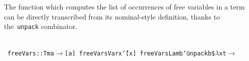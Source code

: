\documentclass[9pt,authoryear]{sigplanconf}
\begin{document}
%
The function which computes the list of occurrences of free variables in a term can
    be directly transcribed from its nominal-style definition, thanks
    to the{~}\texttt{unpack} combinator.%


{\nopagebreak }

%
%
%
~\\~\vphantom{$\{$}\texttt{freeVars\makebox[1.22ex][c]{\_{}}}\texttt{\mbox{\hspace{0.50em}}}\texttt{{:}{:}}\texttt{\mbox{\hspace{0.50em}}}\texttt{Tm}\texttt{\mbox{\hspace{0.50em}}}\texttt{a}\texttt{\mbox{\hspace{0.50em}}}\texttt{$ \rightarrow $}\texttt{\mbox{\hspace{0.50em}}}\texttt{{[}}\texttt{a}\texttt{{]}}\texttt{{\nopagebreak \newline%
}\vphantom{$\{$}}\texttt{freeVars\makebox[1.22ex][c]{\_{}}}\texttt{\mbox{\hspace{0.50em}}}\texttt{\makebox[1.22ex][l]{$ {(} $}}\texttt{Var}\texttt{\mbox{\hspace{0.50em}}}\texttt{x}\texttt{\makebox[1.22ex][r]{$ {)} $}}\texttt{\mbox{\hspace{0.50em}}}\texttt{{\char `\=}}\texttt{\mbox{\hspace{0.50em}}}\texttt{{[}}\texttt{x}\texttt{{]}}\texttt{{\nopagebreak \newline%
}\vphantom{$\{$}}\texttt{freeVars\makebox[1.22ex][c]{\_{}}}\texttt{\mbox{\hspace{0.50em}}}\texttt{\makebox[1.22ex][l]{$ {(} $}}\texttt{Lam}\texttt{\mbox{\hspace{0.50em}}}\texttt{b}\texttt{\makebox[1.22ex][r]{$ {)} $}}\texttt{\mbox{\hspace{0.50em}}}\texttt{{\char `\=}}\texttt{\mbox{\hspace{0.50em}}}\texttt{unpack}\texttt{\mbox{\hspace{0.50em}}}\texttt{b}\texttt{\mbox{\hspace{0.50em}}}\texttt{\${}}\texttt{\mbox{\hspace{0.50em}}}\texttt{$ \lambda $}\texttt{\mbox{\hspace{0.50em}}}\texttt{x}\texttt{\mbox{\hspace{0.50em}}}\texttt{t}\texttt{\mbox{\hspace{0.50em}}}\texttt{$ \rightarrow $}\texttt{{\nopagebreak \newline%
}}
\end{document}
